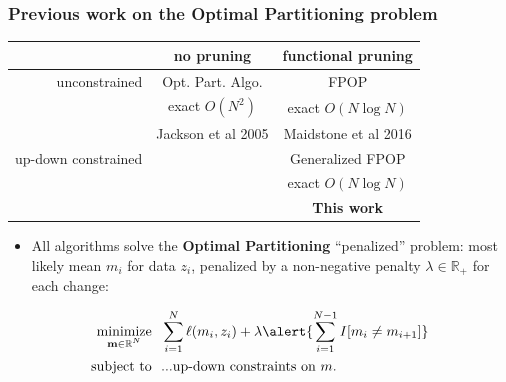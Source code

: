 \documentclass{beamer}
\DeclareMathOperator*{\minimize}{minimize}
\newcommand{\RR}{\mathbb R}
\begin{document}
\begin{frame}
  \frametitle{Previous work on the Optimal Partitioning problem}
  \begin{tabular}{r|c|c}
    & no pruning & functional pruning \\
    \hline
    unconstrained & Opt. Part. Algo. & FPOP \\
     & exact $O(N^2)$ & exact $O(N\log N)$\\
    & Jackson et al 2005 & Maidstone et al 2016\\
    \hline
    up-down constrained &  & Generalized FPOP \\
     &  & exact $O(N\log N)$\\
    &  & \textbf{This work}\\
    \hline
  \end{tabular}
  \begin{itemize}
  \item All algorithms solve the \textbf{Optimal Partitioning}
    ``penalized'' problem: most likely mean $m_i$ for data $z_i$,
    penalized by a non-negative penalty $\lambda\in\RR_+$ for each change:
  \end{itemize}
\begin{align*}
    \minimize_{\substack{
  \mathbf m\in\RR^{N}
  }} &\ \ 
    \sum_{i=1}^N \ell( m_i,  z_i)  + \lambda\alert{\sum_{i=1}^{N-1}I[m_{i}\neq m_{i+1}]}
\\
      \text{subject to} &\ \ \text{...up-down constraints on $m$.}
  \nonumber 
\end{align*}
\end{frame}
\end{document}

